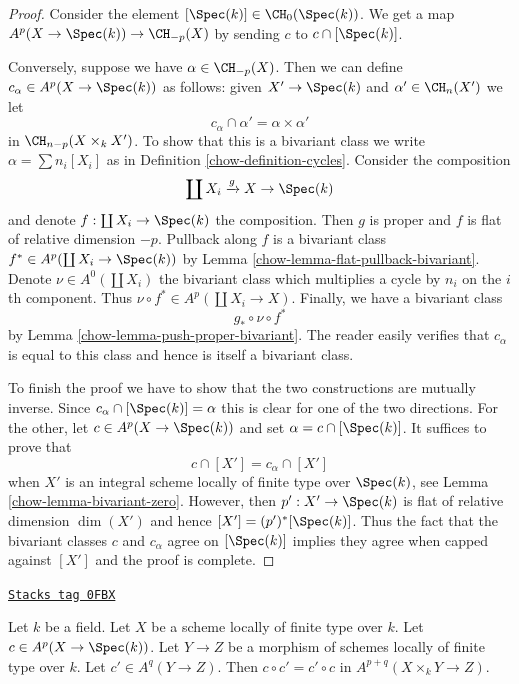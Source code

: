 \begin{proof}

Consider the element $[\Spec(k)] \in \CH_0(\Spec(k))$. We get a map
$A^p(X \to \Spec(k)) \to \CH_{-p}(X)$ by sending $c$ to $c \cap [\Spec(k)]$.

\medskip\noindent
Conversely, suppose we have $\alpha \in \CH_{-p}(X)$.
Then we can define $c_\alpha \in A^p(X \to \Spec(k))$ as
follows: given $X' \to \Spec(k)$ and $\alpha' \in \CH_n(X')$
we let
$$
c_\alpha \cap \alpha' = \alpha \times \alpha'
$$
in $\CH_{n - p}(X \times_k X')$. To show that this is a bivariant
class we write $\alpha = \sum n_i[X_i]$ as in
Definition \ref{chow-definition-cycles}. Consider the composition
$$
\coprod X_i \xrightarrow{g} X \to \Spec(k)
$$
and denote $f : \coprod X_i \to \Spec(k)$ the composition.
Then $g$ is proper and $f$ is flat of relative dimension $-p$.
Pullback along $f$ is a bivariant class
$f^* \in A^p(\coprod X_i \to \Spec(k))$ by
Lemma \ref{chow-lemma-flat-pullback-bivariant}.
Denote $\nu \in A^0(\coprod X_i)$ the bivariant class
which multiplies a cycle by $n_i$ on the $i$th component.
Thus $\nu \circ f^* \in A^p(\coprod X_i \to X)$.
Finally, we have a bivariant class
$$
g_* \circ \nu \circ f^*
$$
by Lemma \ref{chow-lemma-push-proper-bivariant}. The reader easily
verifies that $c_\alpha$ is equal to this class and hence
is itself a bivariant class.

\medskip\noindent
To finish the proof we have to show that the two constructions
are mutually inverse. Since $c_\alpha \cap [\Spec(k)] = \alpha$
this is clear for one of the two directions. For the other, let
$c \in A^p(X \to \Spec(k))$ and set $\alpha = c \cap [\Spec(k)]$.
It suffices to prove that
$$
c \cap [X'] = c_\alpha \cap [X']
$$
when $X'$ is an integral scheme locally of finite type over $\Spec(k)$,
see Lemma \ref{chow-lemma-bivariant-zero}. However, then $p' : X' \to \Spec(k)$
is flat of relative dimension $\dim(X')$ and hence
$[X'] = (p')^*[\Spec(k)]$. Thus the fact that the bivariant classes
$c$ and $c_\alpha$ agree on $[\Spec(k)]$ implies they
agree when capped against $[X']$ and the proof is complete.
\end{proof}

\begin{lemma}
\label{chow-lemma-chow-cohomology-towards-point-commutes}
\href{https://stacks.math.columbia.edu/tag/0FBX}{\texttt{Stacks tag 0FBX}}

Let $k$ be a field. Let $X$ be a scheme locally of finite type over $k$.
Let $c \in A^p(X \to \Spec(k))$. Let $Y \to Z$ be a morphism of schemes
locally of finite type over $k$. Let $c' \in A^q(Y \to Z)$. Then
$c \circ c' = c' \circ c$ in $A^{p + q}(X \times_k Y \to Z)$.
\end{lemma}

